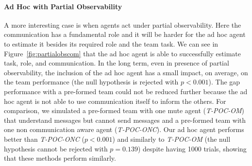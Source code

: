 
\vspace{-0.3cm}
\paragraph{Ad Hoc with Partial Observability}

A more interesting case is when agents act under partial observability. Here the communication has a fundamental role and it will be harder for the ad hoc agent to estimate it besides its required role and the team task. We can see in Figure~\ref{fig:partialobscom} that the ad hoc agent is able to successfully estimate task, role, and communication. In the long term, even in presence of partial observability, the inclusion of the ad hoc agent has a small impact, on average, on the team performance (the null hypothesis is rejected with {\small$p<0.001$}). The gap performance with a pre-formed team could not be reduced further because the ad hoc agent is not able to use communication itself to inform the others. For comparison, we simulated a pre-formed team with one mute agent (\emph{T-POC-OM}) that understand messages but cannot send messages and a pre-formed team with one non communication aware agent (\emph{T-POC-ONC}). Our ad hoc agent performs better than \emph{T-POC-ONC} ({\small$p<0.001$}) and similarly to \emph{T-POC-OM} (the null hypothesis cannot be rejected with {\small$p=0.139$}) despite having 1000 trials, showing that these methods perform similarly.


